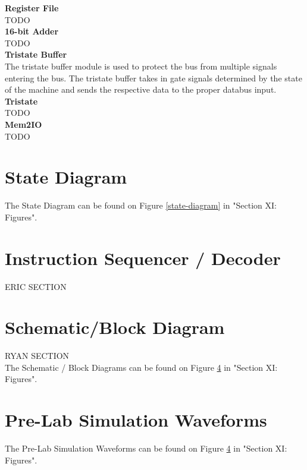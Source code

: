 \documentclass[journal, twocolumn, final,11pt,letterpaper]{IEEEtran}
\begin{document}
\normalsize\textbf{Register File} \\
TODO \\

\normalsize\textbf{16-bit Adder} \\
TODO \\

\normalsize\textbf{Tristate Buffer} \\
The tristate buffer module is used to protect the bus from multiple signals entering the bus.  The tristate buffer takes in gate signals determined by the state of the machine and sends the respective data to the proper databus input. \\

\normalsize\textbf{Tristate} \\
TODO \\

\normalsize\textbf{Mem2IO} \\
TODO \\




\section{State Diagram}
The State Diagram can be found on Figure \ref{state-diagram} in "Section XI: Figures".

\section{Instruction Sequencer / Decoder}
ERIC SECTION 

\section{Schematic/Block Diagram}
RYAN SECTION\\

The Schematic / Block Diagrams can be found on Figure \ref{} in "Section XI: Figures".

\section{Pre-Lab Simulation Waveforms}
The Pre-Lab Simulation Waveforms can be found on Figure \ref{} in "Section XI: Figures".

\end{document}
